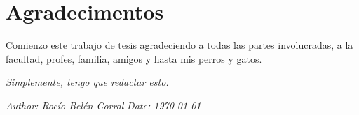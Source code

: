 \chapter*{Agradecimentos}

Comienzo este trabajo de tesis agradeciendo a todas las partes involucradas, a la facultad, profes, familia, amigos y hasta mis perros y gatos.


\begin{block}[todo]
    \textit{Simplemente, tengo que redactar esto.}
\end{block}

\textit{Author: Rocío Belén Corral}
\textit{Date: \today}

